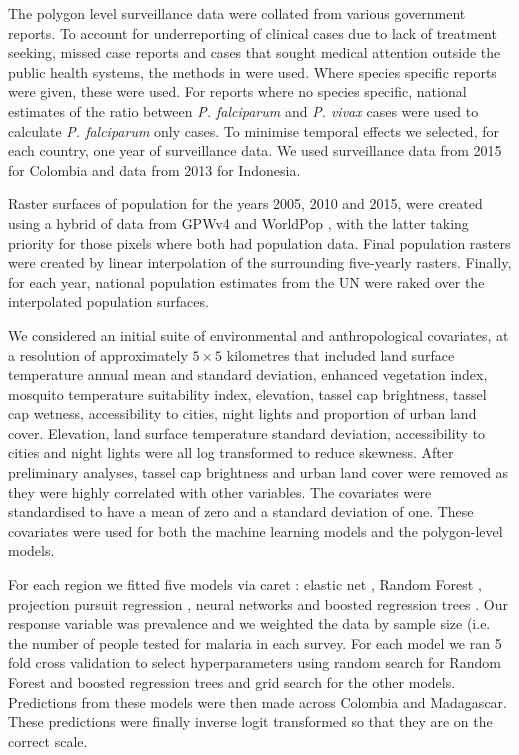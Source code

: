 \documentclass[11pt]{article}
\begin{document}
The polygon level surveillance data were collated from various government reports. To account for underreporting of clinical cases due to lack of treatment seeking, missed case reports and cases that sought medical attention outside the public health systems, the methods in \citep{cibulskis2011worldwide} were used. Where species specific reports were given, these were used. For reports where no species specific, national estimates of the ratio between \emph{P. falciparum} and \emph{P. vivax} cases were used to calculate \emph{P. falciparum} only cases. To minimise temporal effects we selected, for each country, one year of surveillance data. 
We used surveillance data from 2015 for Colombia and data from 2013 for Indonesia.

Raster surfaces of population for the years 2005, 2010 and 2015, were created using a hybrid of data from GPWv4 \citep{gpw4} and WorldPop \citep{tatem2017worldpop}, with the latter taking priority for those pixels where both had population data. 
Final population rasters were created by linear interpolation of the surrounding five-yearly rasters. 
Finally, for each year, national population estimates from the UN were raked over the interpolated population surfaces. 

We considered an initial suite of environmental and anthropological covariates, at a resolution of approximately $5 \times 5$ kilometres that included land surface temperature annual mean and standard deviation, enhanced vegetation index, mosquito temperature suitability index, elevation, tassel cap brightness, tassel cap wetness, accessibility to cities, night lights and proportion of urban land cover. 
Elevation, land surface temperature standard deviation, accessibility to cities and night lights were all log transformed to reduce skewness. 
After preliminary analyses, tassel cap brightness and urban land cover were removed as they were highly correlated with other variables. 
The covariates were standardised to have a mean of zero and a standard deviation of one. 
These covariates were used for both the machine learning models and the polygon-level models.

For each region we fitted five models via caret \citep{caret}: elastic net \citep{enet}, Random Forest \citep{wright2015ranger}, projection pursuit regression \citep{friedman1981projection}, neural networks \citep{nnet} and boosted regression trees \citep{gbm}.
Our response variable was prevalence and we weighted the data by sample size (i.e. the number of people tested for malaria in each survey.
For each model we ran 5 fold cross validation to select hyperparameters using random search for Random Forest and boosted regression trees and grid search for the other models. 
Predictions from these models were then made across Colombia and Madagascar.
These predictions were finally inverse logit transformed so that they are on the correct scale.
\end{document}
